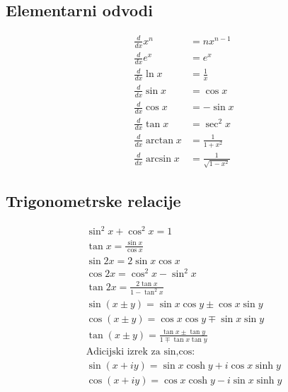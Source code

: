\documentclass[a4paper,fleqn]{article} %
\begin{document}
\subsection*{\footnotesize Elementarni odvodi}
\begin{align*}
\frac{d}{dx}x^n &= nx^{n-1}\\
\frac{d}{dx}e^x &= e^x\\
\frac{d}{dx}\ln x &= \frac{1}{x}\\
\frac{d}{dx}\sin x &= \cos x\\
\frac{d}{dx}\cos x &= -\sin x\\
\frac{d}{dx}\tan x &= \sec^2 x\\
\frac{d}{dx}\arctan x &= \frac{1}{1+x^2}\\
\frac{d}{dx}\arcsin x &= \frac{1}{\sqrt{1-x^2}}
\end{align*}

\subsection*{Trigonometrske relacije}
\begin{gather*}
    \sin^2 x + \cos^2 x = 1\\ 
    \tan x = \frac{\sin x}{\cos x}\\
    \sin 2x = 2\sin x \cos x\\
    \cos 2x = \cos^2 x - \sin^2 x \\
    \tan 2x = \frac{2\tan x}{1 - \tan^2 x}\\
    \sin(x \pm y) = \sin x \cos y \pm \cos x \sin y\\
    \cos(x \pm y) = \cos x \cos y \mp \sin x \sin y\\
    \tan(x \pm y) = \frac{\tan x \pm \tan y}{1 \mp \tan x \tan y}\\
    \text{Adicijski izrek za sin,cos}: \\
    \sin (x+iy)=\sin x \cosh y + i \cos x \sinh y\\
    \cos (x+iy)=\cos x \cosh y - i \sin x \sinh y
\end{gather*}
\end{document}
